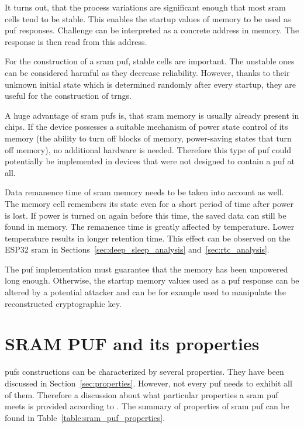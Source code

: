 It turns out, that the process variations are significant enough that most \gls{sram} cells tend to be stable. This enables the startup values of memory to be used as \gls{puf} responses. Challenge can be interpreted as a concrete address in memory. The response is then read from this address.\cite{Maes2013}

For the construction of a \gls{sram} \gls{puf}, stable cells are important. The unstable ones can be considered harmful as they decrease reliability. However, thanks to their unknown initial state which is determined randomly after every startup, they are useful for the construction of \glspl{trng}.\cite{Holcomb2009}

A huge advantage of \gls{sram} \glspl{puf} is, that \gls{sram} memory is usually already present in chips. If the device possesses a suitable mechanism of power state control of its memory (the ability to turn off blocks of memory, power-saving states that turn off memory), no additional hardware is needed. Therefore this type of \gls{puf} could potentially be implemented in devices that were not designed to contain a \gls{puf} at all.

Data remanence time of \gls{sram} memory needs to be taken into account as well. The memory cell remembers its state even for a short period of time after power is lost. If power is turned on again before this time, the saved data can still be found in memory. The remanence time is greatly affected by temperature. Lower temperature results in longer retention time. This effect can be observed on the ESP32 \gls{sram} in Sections~\ref{sec:deep_sleep_analysis} and~\ref{sec:rtc_analysis}.

The \gls{puf} implementation must guarantee that the memory has been unpowered long enough. Otherwise, the startup memory values used as a \gls{puf} response can be altered by a potential attacker and can be for example used to manipulate the reconstructed cryptographic key.\cite{Nikolaos2018}

\section{SRAM PUF and its properties}\label{sec:srampuf_properties}

\glspl{puf} constructions can be characterized by several properties. They have been discussed in Section~\ref{sec:properties}. However, not every \gls{puf} needs to exhibit all of them. Therefore a discussion about what particular properties a \gls{sram} \gls{puf} meets is provided according to \cite{Maes2013}. The summary of properties of \gls{sram} \gls{puf} can be found in Table~\ref{table:sram_puf_properties}.

